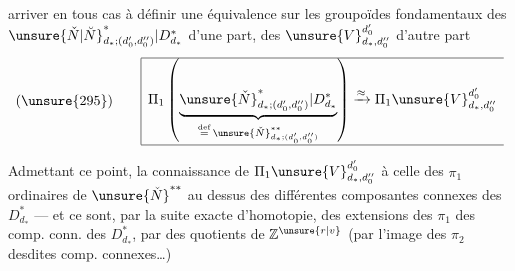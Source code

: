 
arriver en tous cas à définir une équivalence  sur les groupoïdes fondamentaux des $\unsure{\check N|\breve N}^{*}_{d_*;(d'_0,d''_0)}|D_{d_*}^{*}$ d'une part, des $\unsure{V}_{d_*,d''_0}^{d'_0}$ d'autre part
\[
(\unsure{295})\qquad
\begin{array}{|l}
\hline
\displaystyle
\Pi_1\left(\underbrace{\unsure{\check N}^{*}_{d_*;(d'_0,d''_0)}|D_{d_*}^{*}}_{\overset{\mathrm{def}}{=}\,\unsure{\check N}^{**}_{d_*;(d'_0,d''_0)}}\right)
\xrightarrow{\approx}\Pi_1\unsure{V}_{d_*,d''_0}^{d'_0}\\
\hline
\end{array}
\]

Admettant ce point, la connaissance de $\Pi_1\unsure{V}_{d_*,d''_0}^{d'_0}$   à celle des $\pi_1$ ordinaires de $\unsure{\check N}^{**}$  au dessus des différentes composantes connexes des $D_{d_*}^{*}$ --- et ce sont, par la suite exacte d'homotopie, des extensions des $\pi_1$ des comp. conn. des $D_{d_*}^{*}$, par des quotients de $\mathbb Z^{\unsure{r|v}}$ (par l'image des $\pi_2$ desdites comp. connexes\ldots)

